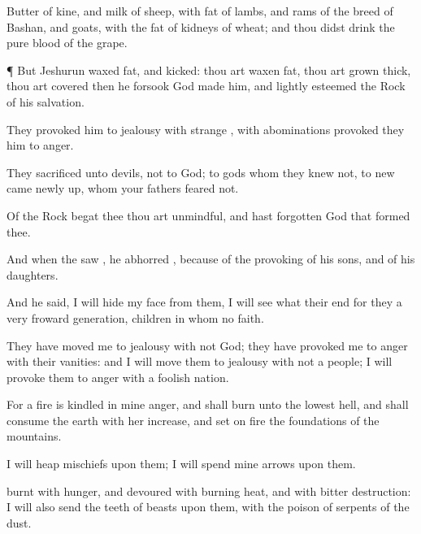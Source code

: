 {Butter of
kine, and
milk of
sheep, with
fat of
lambs, and
rams of the
breed of
Bashan, and
goats, with the
fat of
kidneys of
wheat; and thou didst
drink the
pure
blood of the
grape.


\par }{\PP {}¶ But
Jeshurun waxed
fat, and
kicked: thou art waxen
fat, thou art grown
thick, thou art
covered
{} then he
forsook
God
{}
made him, and lightly
esteemed the
Rock of his
salvation.

They provoked him to
jealousy with
strange
{}, with
abominations provoked they him to
anger.

They
sacrificed unto
devils, not to
God; to
gods whom they
knew not, to
new
{}
came
newly
up, whom your
fathers
feared not.

Of the
Rock
{}
begat thee thou art
unmindful, and hast
forgotten
God that
formed thee.


\par }{\PP {}And when the
{}
saw
{}, he
abhorred
{}, because of the
provoking of his
sons, and of his
daughters.

And he
said, I will
hide my
face from them, I will
see what their
end
{} for they
{} a very
froward
generation,
children in whom
{} no
faith.

They have moved me to
jealousy with
{}
not
God; they have provoked me to
anger with their
vanities: and I will move them to
jealousy with
{} not a
people; I will provoke them to
anger with a
foolish
nation.

For a
fire is
kindled in mine
anger, and shall
burn unto the
lowest
hell, and shall
consume the
earth with her
increase, and set on
fire the
foundations of the
mountains.

I will
heap
mischiefs upon them; I will
spend mine
arrows upon them.

burnt with
hunger, and
devoured with burning
heat, and with
bitter
destruction: I will also
send the
teeth of
beasts upon them, with the
poison of
serpents of the
dust.

}

